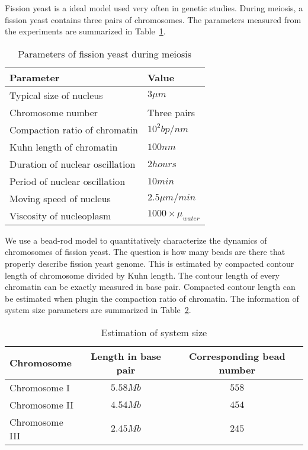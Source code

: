 \documentclass{article}
\begin{document}
Fission yeast is a ideal model used very often in genetic studies. During meiosis, a fission yeast contains three pairs of chromosomes. The parameters measured from the experiments are summarized in Table~\ref{tab:parameters}.
\begin{table}[!ht]
\caption{Parameters of fission yeast during meiosis}
\label{tab:parameters}
\begin{tabular}{l|l}
	\hline
	\textbf{Parameter} & \textbf{Value} \\
	\hline
	Typical size of nucleus          &  $3\mu m$ \\
	Chromosome number                &  Three pairs \\
	Compaction ratio of chromatin    &  $10^2bp/nm$ \\
	Kuhn length of chromatin         &  $100nm$  \\
	Duration of nuclear oscillation  &  $2 hours$  \\
	Period of nuclear oscillation    &  $10 min$  \\
	Moving speed of nucleus          &  $2.5\mu m/min$ \\
	Viscosity of nucleoplasm         &  $1000\times \mu_{water}$ \\
	\hline
\end{tabular}

\end{table}

We use a bead-rod model to quantitatively characterize the dynamics of chromosomes of fission yeast. 
The question is how many beads are there that properly describe fission yeast genome. This is estimated by compacted contour length of chromosome divided by Kuhn length. 
The contour length of every chromatin can be exactly measured in base pair. Compacted contour length can be estimated when plugin the compaction ratio of chromatin.
The information of system size parameters are summarized in Table~\ref{tab:size}.
\begin{table}[!ht]
\caption{Estimation of system size}
\label{tab:size}
\begin{tabular}{l|c|c}
	\hline
	\textbf{Chromosome} & \textbf{Length in base pair} & \textbf{Corresponding bead number} \\
	\hline
	Chromosome I   & $5.58Mb$  & $558$ \\
	Chromosome II  & $4.54Mb$  & $454$ \\
	Chromosome III & $2.45Mb$  & $245$ \\
	\hline
\end{tabular}
\end{table}
\end{document}
